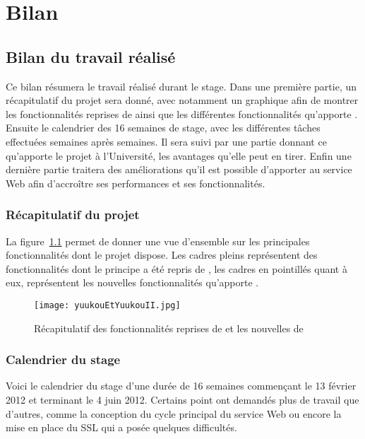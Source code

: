 \chapter{Bilan}

\section{Bilan du travail r\'ealis\'e}

Ce bilan r\'esumera le travail r\'ealis\'e durant le stage.
Dans une premi\`ere partie, un r\'ecapitulatif du projet sera donn\'e, avec notamment un graphique afin de montrer les fonctionnalit\'es reprises de {\Yuukou} ainsi que les diff\'erentes fonctionnalit\'es qu'apporte {\YuukouII}.
Ensuite le calendrier des 16 semaines de stage, avec les diff\'erentes t\^aches effectu\'ees semaines apr\`es semaines.
Il sera suivi par une partie donnant ce qu'apporte le projet \`a l'Universit\'e, les avantages qu'elle peut en tirer.
Enfin une derni\`ere partie traitera des am\'eliorations qu'il est possible d'apporter au service Web afin d'accro\^itre ses performances et ses fonctionnalit\'es.

\subsection{R\'ecapitulatif du projet}

La figure~\ref{figure:yuukouEtYuukouII} permet de donner une vue d'ensemble sur les principales fonctionnalit\'es dont le projet dispose.
Les cadres pleins repr\'esentent des fonctionnalit\'es dont le principe a \'et\'e repris de {\Yuukou}, les cadres en pointill\'es quant \`a eux, repr\'esentent les nouvelles fonctionnalit\'es qu'apporte \YuukouII.

\clearpage

\begin{figure}[!ht]
	\centering
	\texttt{[image: yuukouEtYuukouII.jpg]}
	\caption{R\'ecapitulatif des fonctionnalit\'es reprises de {\Yuukou} et les nouvelles de \YuukouII}
	\label{figure:yuukouEtYuukouII}

\end{figure}

\subsection{Calendrier du stage}

Voici le calendrier du stage d'une dur\'ee de 16 semaines commen\c{c}ant le 13 f\'evrier 2012 et terminant le 4 juin 2012.
Certains point ont demand\'es plus de travail que d'autres, comme la conception du cycle principal du service Web ou encore la mise en place du SSL qui a pos\'ee quelques difficult\'es.


